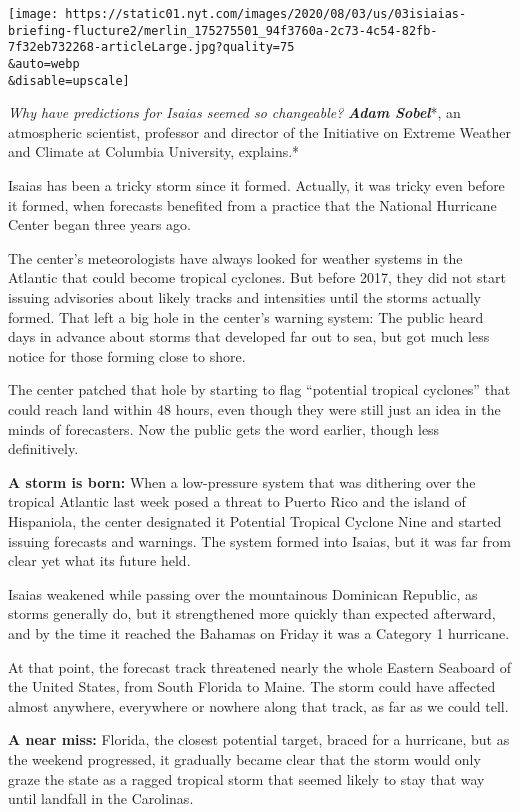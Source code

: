 \texttt{[image: https://static01.nyt.com/images/2020/08/03/us/03isiaias-briefing-flucture2/merlin\_175275501\_94f3760a-2c73-4c54-82fb-7f32eb732268-articleLarge.jpg?quality=75\\\&auto=webp\\\&disable=upscale]}

\emph{Why have predictions for Isaias seemed so changeable?}
\emph{\textbf{Adam Sobel}}*, an atmospheric scientist, professor and
director of the Initiative on Extreme Weather and Climate at Columbia
University, explains.*

Isaias has been a tricky storm since it formed. Actually, it was tricky
even before it formed, when forecasts benefited from a practice that the
National Hurricane Center began three years ago.

The center's meteorologists have always looked for weather systems in
the Atlantic that could become tropical cyclones. But before 2017, they
did not start issuing advisories about likely tracks and intensities
until the storms actually formed. That left a big hole in the center's
warning system: The public heard days in advance about storms that
developed far out to sea, but got much less notice for those forming
close to shore.

The center patched that hole by starting to flag ``potential tropical
cyclones'' that could reach land within 48 hours, even though they were
still just an idea in the minds of forecasters. Now the public gets the
word earlier, though less definitively.

\textbf{A storm is born:} When a low-pressure system that was dithering
over the tropical Atlantic last week posed a threat to Puerto Rico and
the island of Hispaniola, the center designated it Potential Tropical
Cyclone Nine and started issuing forecasts and warnings. The system
formed into Isaias, but it was far from clear yet what its future held.

Isaias weakened while passing over the mountainous Dominican Republic,
as storms generally do, but it strengthened more quickly than expected
afterward, and by the time it reached the Bahamas on Friday it was a
Category 1 hurricane.

At that point, the forecast track threatened nearly the whole Eastern
Seaboard of the United States, from South Florida to Maine. The storm
could have affected almost anywhere, everywhere or nowhere along that
track, as far as we could tell.

\textbf{A near miss:} Florida, the closest potential target, braced for
a hurricane, but as the weekend progressed, it gradually became clear
that the storm would only graze the state as a ragged tropical storm
that seemed likely to stay that way until landfall in the Carolinas.

